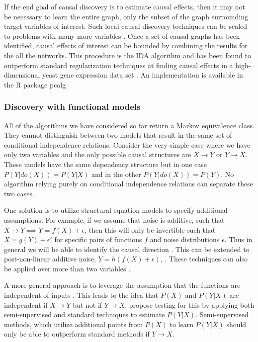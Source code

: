 \documentclass[11pt,a4paper]{article}
\begin{document}
If the end goal of causal discovery is to estimate causal effects, then it may not be necessary to learn the entire graph, only the subset of the graph surrounding target variables of interest. Such local causal discovery techniques can be scaled to problems with many more variables \cite{Aliferis2002}. Once a set of causal graphs has been identified, causal effects of interest can be bounded by combining the results for the all the networks. This procedure is the IDA algorithm \cite{Maathuis2009} and has been found to outperform standard regularization techniques at finding causal effects in a high-dimensional yeast gene expression data set \cite{Maathuis2010}. An implementation is available in the R package pcalg \cite{Kalisch2012}

\subsubsection{Discovery with functional models}
All of the algorithms we have considered so far return a Markov equivalence class. They cannot distinguish between two models that result in the same set of conditional independence relations. Consider the very simple case where we have only two variables and the only possible causal structures are $X \rightarrow Y$ or $Y \rightarrow X$. These models have the same dependency structure but in one case $P(Y|do(X)) = P(Y|X)$ and in the other $P(Y|do(X)) = P(Y)$. No algorithm relying purely on conditional independence relations can separate these two cases.

One solution is to utilize structural equation models to specify additional assumptions. For example, if we assume that noise is additive, such that $X \rightarrow Y \implies Y = f(X)+\epsilon$, then this will only be invertible such that $X = g(Y) + \epsilon'$ for specific pairs of functions $f$ and noise distributions $\epsilon$. Thus in general we will be able to identify the causal direction \cite{Hoyer2009}. This can be extended to post-non-linear additive noise, $Y = h(f(X)+ \epsilon)$, \cite{Zhang2008a}. These techniques can also be applied over more than two variables \cite{Peters2014}.

A more general approach is to leverage the assumption that the functions are independent of inputs \cite{Janzing2012a}. This leads to the idea that $P(X)$ and $P(Y|X)$ are independent if $X \rightarrow Y$ but not if $Y \rightarrow X$. \cite{Janzing2012} propose testing for this by applying both semi-supervised and standard techniques to estimate $P(Y|X)$. Semi-supervised methods, which utilize additional points from $P(X)$ to learn $P(Y|X)$ should only be able to outperform standard methods if $Y \rightarrow X$. 
\end{document}
